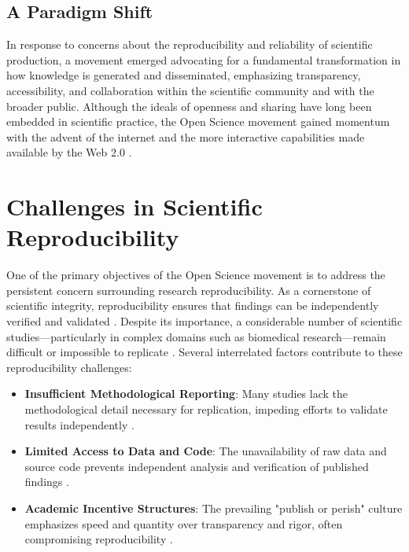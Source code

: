 \documentclass[final]{rc-book-2.14}
\begin{document}
\subsection{A Paradigm Shift}

In response to concerns about the reproducibility and reliability of scientific production, a movement emerged advocating for a fundamental transformation in how knowledge is generated and disseminated, emphasizing transparency, accessibility, and collaboration within the scientific community and with the broader public. Although the ideals of openness and sharing have long been embedded in scientific practice, the Open Science movement gained momentum with the advent of the internet and the more interactive capabilities made available by the Web 2.0 \cite{thibault_open_2023}.

\section{Challenges in Scientific Reproducibility}
\label{chp:review:sec:challenges}

One of the primary objectives of the Open Science movement is to address the persistent concern surrounding research reproducibility. As a cornerstone of scientific integrity, reproducibility ensures that findings can be independently verified and validated \cite{Nosek2015}. Despite its importance, a considerable number of scientific studies—particularly in complex domains such as biomedical research—remain difficult or impossible to replicate \cite{Borgman2012}. Several interrelated factors contribute to these reproducibility challenges:

\begin{itemize}
    \item \textbf{Insufficient Methodological Reporting}: Many studies lack the methodological detail necessary for replication, impeding efforts to validate results independently \cite{Leonelli2016}.
    \item \textbf{Limited Access to Data and Code}: The unavailability of raw data and source code prevents independent analysis and verification of published findings \cite{Piwowar2011}.
    \item \textbf{Academic Incentive Structures}: The prevailing "publish or perish" culture emphasizes speed and quantity over transparency and rigor, often compromising reproducibility \cite{Boulton2015}.
\end{itemize}
\end{document}
